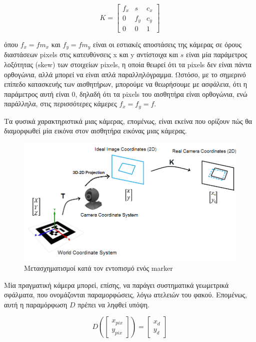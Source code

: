 \begin{equation}
K=
\begin{bmatrix}
f_{x} & s & c_{x}\\
0 & f_{y} & c_{y}\\
0 & 0 & 1
\end{bmatrix}
\end{equation}

όπου $f_{x}=fm_{x}$ και $f_{y}=fm_{y}$ είναι οι εστιακές αποστάσεις της κάμερας σε όρους διαστάσεων pixels στις κατευθύνσεις x και y αντίστοιχα και $s$ είναι μία παράμετρος λοξότητας (skew) των στοιχείων pixels, η οποία θεωρεί ότι τα pixels δεν είναι πάντα ορθογώνια, αλλά μπορεί να είναι απλά παραλληλόγραμμα. Ωστόσο, με το σημερινό επίπεδο κατασκευής των αισθητήρων, μπορούμε να θεωρήσουμε με ασφάλεια, ότι η παράμετρος αυτή είναι 0, δηλαδή ότι τα pixels του αισθητήρα είναι ορθογώνια, ενώ παράλληλα, στις περισσότερες κάμερες $f_{x}=f_{y}=f$. 


Τα φυσικά χαρακτηριστικά μιας κάμερας, επομένως, είναι εκείνα που ορίζουν πώς θα διαμορφωθεί μία εικόνα στον αισθητήρα εικόνας μιας κάμερας.

\begin{figure}[H]
    \centering
    \includegraphics[scale=1.1, angle=0]{Files/Figures/transformation1.png}
    \caption[Μετασχηματισμοί κατά τον εντοπισμό ενός marker.]{ Μετασχηματισμοί κατά τον εντοπισμό ενός marker}
    \label{fig:transformation1}
\end{figure}


Mία πραγματική κάμερα μπορεί, επίσης, να παράγει συστηματικά γεωμετρικά σφάλματα, που ονομάζονται παραμορφώσεις, λόγω ατελειών του φακού. 
Επομένως, αυτή η παραμόρφωση $D$ πρέπει να ληφθεί υπόψη.


\begin{equation}
D
\left(
\begin{bmatrix}
x_{pix}\\
y_{pix}   
\end{bmatrix}
\right )
=
\begin{bmatrix}
x_{d}\\
y_{d}   
\end{bmatrix}
\end{equation} 



